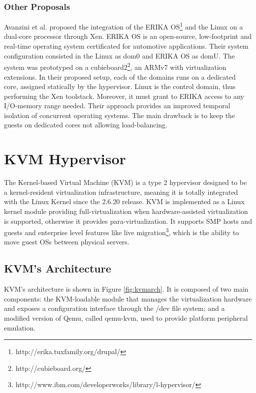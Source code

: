 \subsubsection{Other Proposals}

Avanzini et al. \cite{avanzini2015} proposed the integration of the ERIKA OS\footnote{http://erika.tuxfamily.org/drupal/} and the Linux on a dual-core processor through Xen. ERIKA OS is an open-source, low-footprint and real-time operating system certificated for automotive applications. Their system configuration consisted in the Linux as dom0 and ERIKA OS as domU. The system was prototyped on a cubieboard2\footnote{http://cubieboard.org/}, an ARMv7 with virtualization extensions. In their proposed setup, each of the domains runs on a dedicated core, assigned statically by the hypervisor. Linux is the control domain, thus performing the Xen toolstack. Moreover, it must grant to ERIKA access to any I/O-memory range needed. Their approach provides an improved temporal isolation of concurrent operating systems. The main drawback is to keep the guests on dedicated cores not allowing load-balancing. 

\section{KVM Hypervisor}
\label{section:kvm}

The Kernel-based Virtual Machine (KVM) is a type 2 hypervisor designed to be a kernel-resident virtualization infrastructure, meaning it is totally integrated with the Linux Kernel since the 2.6.20 release. KVM is implemented as a Linux kernel module providing full-virtualization when hardware-assisted virtualization is supported, otherwise it provides para-virtualization. It supports SMP hosts and guests and enterprise level features like live migration\footnote{http://www.ibm.com/developerworks/library/l-hypervisor/}, which is the ability to move guest OSs between physical servers.

\subsection{KVM's Architecture}
\label{subsection:kvmarch}

KVM's architecture is shown in Figure \ref{fig:kvmarch}. It is composed of two main components: the KVM-loadable module that manages the virtualization hardware and exposes a configuration interface through the /dev file system; and a modified version of Qemu, called qemu-kvm, used to provide platform peripheral emulation. 

